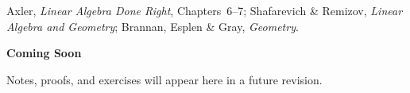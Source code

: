 \begin{remark*}
Axler, \textit{Linear Algebra Done Right}, Chapters~6--7;
Shafarevich \& Remizov, \textit{Linear Algebra and Geometry};
Brannan, Esplen \& Gray, \textit{Geometry}.
\end{remark*}

\vspace{1em}
\begin{tcolorbox}[
  colback=gray!6, colframe=gray!40, arc=2pt,
  left=8pt, right=8pt, top=6pt, bottom=6pt,
  title={\small\textbf{Status: Planned}},
  fonttitle=\small\bfseries
]
\begin{center}\Large\bfseries Coming Soon\end{center}
\vspace{6pt}
\noindent Notes, proofs, and exercises will appear here in a future revision.
\end{tcolorbox}

% 
% 
% 
% 
% 
